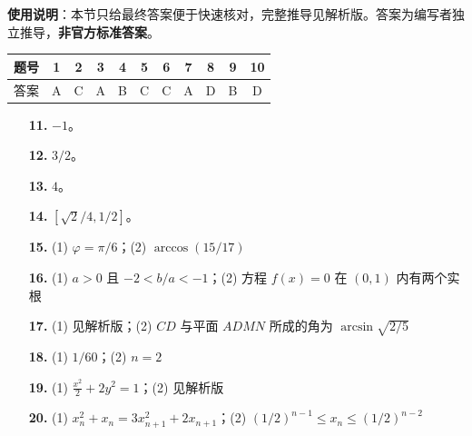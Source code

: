 
\begin{gknotice}
\textbf{使用说明}：本节只给最终答案便于快速核对，完整推导见解析版。答案为编写者独立推导，\textbf{非官方标准答案}。
\end{gknotice}

\begin{center}\begin{tabular}{ccccccccccc}
\toprule
题号 & 1 & 2 & 3 & 4 & 5 & 6 & 7 & 8 & 9 & 10 \\
\midrule
答案 & A & C & A & B & C & C & A & D & B & D \\
\bottomrule
\end{tabular}\end{center}

\begin{itemize}[leftmargin=2.6em]
  \item[\textbf{11.}] $-1$。
  \item[\textbf{12.}] $3/2$。
  \item[\textbf{13.}] $4$。
  \item[\textbf{14.}] $[\sqrt2/4,1/2]$。
\end{itemize}

\begin{itemize}[leftmargin=2.6em]
  \item[\textbf{15.}] (1) $\varphi=\pi/6$；(2) $\arccos(15/17)$
  \item[\textbf{16.}] (1) $a>0$ 且 $-2<b/a<-1$；(2) 方程 $f(x)=0$ 在 $(0,1)$ 内有两个实根
  \item[\textbf{17.}] (1) 见解析版；(2) $CD$ 与平面 $ADMN$ 所成的角为 $\arcsin\sqrt{2/5}$
  \item[\textbf{18.}] (1) $1/60$；(2) $n=2$
  \item[\textbf{19.}] (1) $\frac{x^2}{2}+2y^2=1$；(2) 见解析版
  \item[\textbf{20.}] (1) $x_n^2+x_n=3x_{n+1}^2+2x_{n+1}$；(2) $(1/2)^{n-1}\leqslant x_n\leqslant(1/2)^{n-2}$
\end{itemize}

